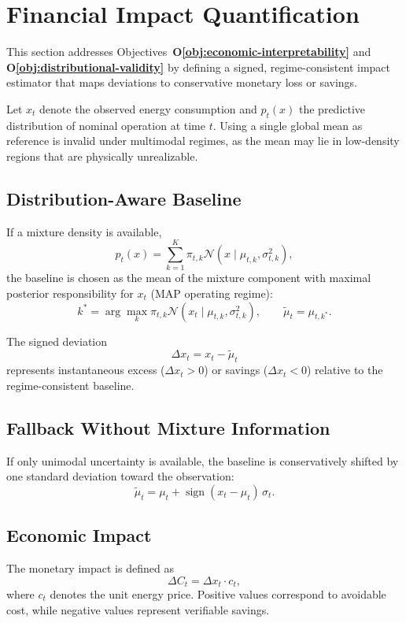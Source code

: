 \section{Financial Impact Quantification}
\label{sec:financial-impact}

This section addresses Objectives~\textbf{O\ref{obj:economic-interpretability}} and
\textbf{O\ref{obj:distributional-validity}} by defining a signed, regime-consistent impact estimator that maps deviations to conservative monetary loss or savings.

Let $x_t$ denote the observed energy consumption and $p_t(x)$ the predictive
distribution of nominal operation at time $t$.
Using a single global mean as reference is invalid under multimodal regimes, as the
mean may lie in low-density regions that are physically unrealizable.

\subsection{Distribution-Aware Baseline}

If a mixture density is available,
\[
p_t(x)=\sum_{k=1}^{K}\pi_{t,k}\mathcal{N}(x\mid\mu_{t,k},\sigma_{t,k}^2),
\]
the baseline is chosen as the mean of the mixture component with maximal posterior
responsibility for $x_t$ (MAP operating regime):
\[
k^*=\arg\max_k \pi_{t,k}\mathcal{N}(x_t\mid\mu_{t,k},\sigma_{t,k}^2), \qquad
\tilde{\mu}_t=\mu_{t,k^*}.
\]

The signed deviation
\[
\Delta x_t = x_t - \tilde{\mu}_t
\]
represents instantaneous excess ($\Delta x_t>0$) or savings ($\Delta x_t<0$) relative
to the regime-consistent baseline.

\subsection{Fallback Without Mixture Information}

If only unimodal uncertainty is available, the baseline is conservatively shifted by
one standard deviation toward the observation:
\[
\tilde{\mu}_t =
\mu_t + \operatorname{sign}(x_t-\mu_t)\,\sigma_t .
\]


\subsection{Economic Impact}

The monetary impact is defined as
\[
\Delta C_t = \Delta x_t \cdot c_t ,
\]
where $c_t$ denotes the unit energy price.  
Positive values correspond to avoidable cost, while negative values represent
verifiable savings.

